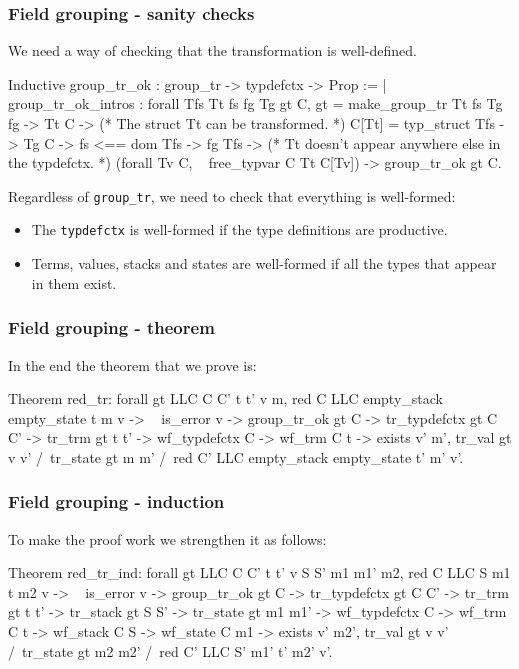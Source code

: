\begin{frame}[fragile]
\frametitle{Field grouping - sanity checks}

We need a way of checking that the transformation is well-defined.

\begin{coqs}
Inductive group_tr_ok : group_tr -> typdefctx -> Prop :=
  | group_tr_ok_intros : forall Tfs Tt fs fg Tg gt C,
      gt = make_group_tr Tt fs Tg fg ->
      Tt \indom C ->
      (* The struct Tt can be transformed. *)
      C[Tt] = typ_struct Tfs ->
      Tg \notindom C ->
      fs <== dom Tfs ->
      fg \notindom Tfs ->
      (* Tt doesn't appear anywhere else in the typdefctx. *)
      (forall Tv \indom C, ~ free_typvar C Tt C[Tv]) ->
      group_tr_ok gt C.
\end{coqs}

\bigskip

Regardless of \texttt{group\_tr}, we need to check that everything is well-formed:
\begin{itemize}
	\item The \texttt{typdefctx} is well-formed if the type definitions are productive.
	\item Terms, values, stacks and states are well-formed if all the types that appear in them exist.
\end{itemize}

\end{frame}


\begin{frame}[fragile]
\frametitle{Field grouping - theorem}

In the end the theorem that we prove is:

\begin{coq}
Theorem red_tr: forall gt LLC C C' t t' v m,
  red C LLC empty_stack empty_state t m v ->
  ~ is_error v ->
  group_tr_ok gt C ->
  tr_typdefctx gt C C' ->
  tr_trm gt t t' ->
  wf_typdefctx C ->
  wf_trm C t ->
  exists v' m',		tr_val gt v v'
		 /\ tr_state gt m m'
		 /\ red C' LLC empty_stack empty_state t' m' v'.
\end{coq}

\end{frame}


\begin{frame}[fragile]
\frametitle{Field grouping - induction}

To make the proof work we strengthen it as follows:

\begin{coq}
Theorem red_tr_ind: forall gt LLC C C' t t' v S S' m1 m1' m2,
  red C LLC S m1 t m2 v ->
  ~ is_error v ->
  group_tr_ok gt C ->
  tr_typdefctx gt C C' ->
  tr_trm gt t t' ->
  tr_stack gt S S' ->
  tr_state gt m1 m1' ->
  wf_typdefctx C ->
  wf_trm C t ->
  wf_stack C S ->
  wf_state C m1 ->
  exists v' m2',				tr_val gt v v'
			/\	tr_state gt m2 m2'
			/\	red C' LLC S' m1' t' m2' v'.
\end{coq}

\end{frame}


